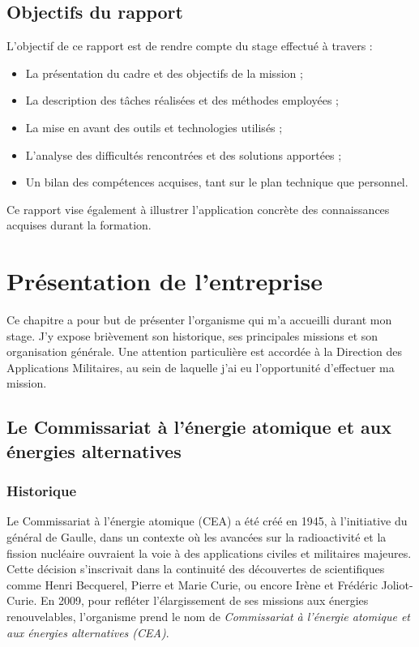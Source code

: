 \documentclass[12pt,a4paper]{report}
\begin{document}
\section{Objectifs du rapport}
L’objectif de ce rapport est de rendre compte du stage effectué à travers :

\begin{itemize}
\item La présentation du cadre et des objectifs de la mission ;
\item La description des tâches réalisées et des méthodes employées ;
\item La mise en avant des outils et technologies utilisés ;
\item L’analyse des difficultés rencontrées et des solutions apportées ;
\item Un bilan des compétences acquises, tant sur le plan technique que personnel.
\end{itemize}

Ce rapport vise également à illustrer l'application concrète des connaissances acquises durant la formation.

\chapter{Présentation de l'entreprise}
Ce chapitre a pour but de présenter l’organisme qui m’a accueilli durant mon stage. J’y expose brièvement son historique, ses principales missions et son organisation générale. Une attention particulière est accordée à la Direction des Applications Militaires, au sein de laquelle j’ai eu l’opportunité d’effectuer ma mission.

\section{Le Commissariat à l'énergie atomique et aux énergies alternatives}
\subsection{Historique}

Le Commissariat à l’énergie atomique (CEA) a été créé en 1945, à l’initiative du général de Gaulle, dans un contexte où les avancées sur la radioactivité et la fission nucléaire ouvraient la voie à des applications civiles et militaires majeures. Cette décision s’inscrivait dans la continuité des découvertes de scientifiques comme Henri Becquerel, Pierre et Marie Curie, ou encore Irène et Frédéric Joliot-Curie. En 2009, pour refléter l’élargissement de ses missions aux énergies renouvelables, l’organisme prend le nom de \textit{Commissariat à l'énergie atomique et aux énergies alternatives (CEA)}.
\end{document}
